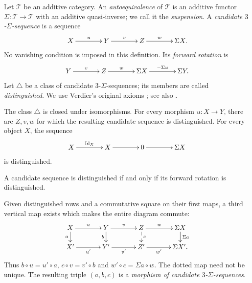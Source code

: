 \documentclass[a4paper,reqno,10pt]{amsart}
\numberwithin{equation}{section}
\begin{document}
\begin{definition}\label{def:verdier-axioms}
Let $\mathcal T$ be an additive category. An \emph{autoequivalence} of
$\mathcal T$ is an additive functor
$\Sigma:\mathcal T\longrightarrow\mathcal T$ with an additive
quasi-inverse; we call it the \emph{suspension}. A
\emph{candidate $3$-$\Sigma$-sequence} is a sequence
\[
\xymatrix@C=38pt{
X\ar[r]^-{u}&Y\ar[r]^-{v}&Z\ar[r]^-{w}&\Sigma X.
}
\]
No vanishing condition is imposed in this definition. Its
\emph{forward rotation} is
\[
\xymatrix@C=38pt{
Y\ar[r]^-{v}&Z\ar[r]^-{w}&\Sigma X\ar[r]^-{-\Sigma u}&\Sigma Y.
}
\]
Let $\triangle$ be a class of candidate $3$-$\Sigma$-sequences; its
members are called \emph{distinguished}. We use Verdier's original axioms
\cite[Definition~1-1]{Verdier1977}; see also \cite[\S1.1]{Neeman2001}.

\begin{description}[leftmargin=3.6em,style=nextline]
\item[$\mathbf{TR1}$]
The class $\triangle$ is closed under isomorphisms. For every morphism $u:X\longrightarrow Y$, there are
$Z,v,w$ for which the resulting candidate sequence is distinguished. For
every object $X$, the sequence
\[
\xymatrix@C=38pt{
X\ar[r]^-{\mathrm{Id}_X}&X\ar[r]&0\ar[r]&\Sigma X
}
\]
is distinguished.

\item[$\mathbf{TR2}$]
A candidate sequence is distinguished if and only if its forward
rotation is distinguished.

\item[$\mathbf{TR3}$]
Given distinguished rows and a commutative square on their first maps, a
third vertical map exists which makes the entire diagram commute:
\[
\xymatrix@C=35pt@R=15pt{
X\ar[r]^-{u}\ar[d]_-{a}&
Y\ar[r]^-{v}\ar[d]_-{b}&
Z\ar[r]^-{w}\ar@{-->}[d]^-{c}&
\Sigma X\ar[d]^-{\Sigma a}\\
X'\ar[r]_-{u'}&Y'\ar[r]_-{v'}&Z'\ar[r]_-{w'}&\Sigma X'.
}
\]
Thus $b\circ u=u'\circ a$, $c\circ v=v'\circ b$ and $w'\circ c=\Sigma a\circ w$.
The dotted map need not be unique. The resulting triple $(a,b,c)$ is a
\emph{morphism of candidate $3$-$\Sigma$-sequences}. 


\end{description}
\end{definition}
\end{document}

